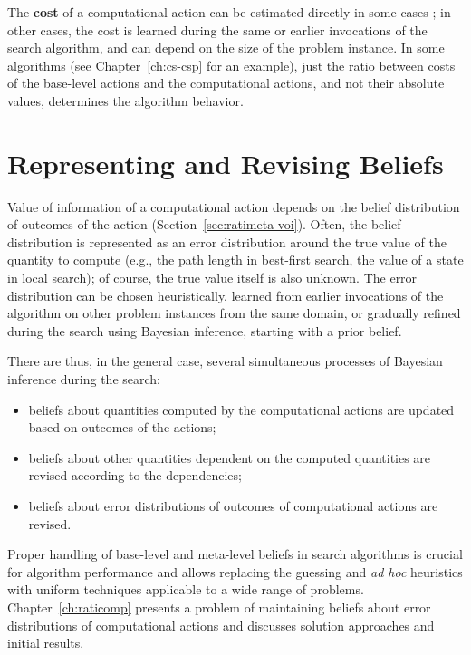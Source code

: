 The {\bf cost} of a computational action can be estimated directly in
some cases \cite{Russell.right}; in other cases, the cost is learned
during the same or earlier invocations of the search algorithm, and
can depend on the size of the problem instance. In some algorithms
(see Chapter~\ref{ch:cs-csp} for an example), just the ratio between
costs of the base-level actions and the computational actions, and not
their absolute values, determines the algorithm behavior.

\section{Representing and Revising Beliefs}

Value of information of a computational action depends on the belief
distribution of outcomes of the action
(Section~\ref{sec:ratimeta-voi}).  Often, the belief distribution is
represented as an error distribution around the true value of the
quantity to compute (e.g., the path length in best-first search, the
value of a state in local search); of course, the true value itself is
also unknown.  The error distribution can be chosen heuristically,
learned from earlier invocations of the algorithm on other problem
instances from the same domain, or gradually refined during the search
using Bayesian inference, starting with a prior belief.

There are thus, in the general case, several simultaneous processes of
Bayesian inference during the search:
\begin{itemize}
\item beliefs about quantities computed by the computational actions
are updated based on outcomes of the actions;
\item beliefs about other quantities dependent on the computed
quantities are revised according to the dependencies;
\item beliefs about error distributions of  outcomes of computational
actions are revised.
\end{itemize}
Proper handling of base-level and meta-level beliefs in search
algorithms is crucial for algorithm performance and allows replacing
the guessing and {\it ad hoc} heuristics with uniform techniques
applicable to a wide range of
problems. Chapter~\ref{ch:raticomp} presents a
problem of maintaining beliefs about error distributions of
computational actions and discusses solution approaches and initial
results.

